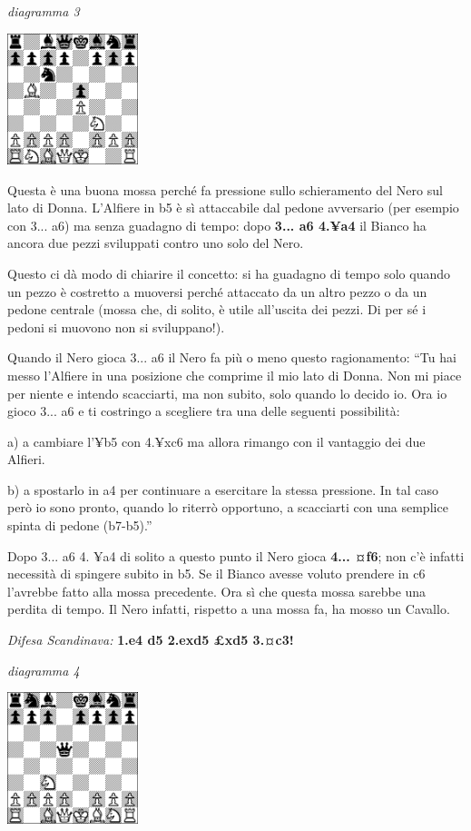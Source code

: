 \documentclass[
]{article}
\begin{document}
\emph{diagramma 3}

\includegraphics[width=1.50417in,height=1.50417in]{vertopal_109f12be458a423d8f3cc838880eaea2/media/image3.png}

Questa è una buona mossa perché fa pressione sullo schieramento del Nero
sul lato di Donna. L'Alfiere in b5 è sì attaccabile dal pedone
avversario (per esempio con 3... a6) ma senza guadagno di tempo: dopo
\textbf{3... a6 4.¥a4} il Bianco ha ancora due pezzi sviluppati contro
uno solo del Nero.

Questo ci dà modo di chiarire il concetto: si ha guadagno di tempo solo
quando un pezzo è costretto a muoversi perché attaccato da un altro
pezzo o da un pedone centrale (mossa che, di solito, è utile all'uscita
dei pezzi. Di per sé i pedoni si muovono non si sviluppano!).

Quando il Nero gioca 3... a6 il Nero fa più o meno questo ragionamento:
``Tu hai messo l'Alfiere in una posizione che comprime il mio lato di
Donna. Non mi piace per niente e intendo scacciarti, ma non subito, solo
quando lo decido io. Ora io gioco 3... a6 e ti costringo a scegliere tra
una delle seguenti possibilità:

a) a cambiare l'¥b5 con 4.¥xc6 ma allora rimango con il vantaggio dei
due Alfieri.

b) a spostarlo in a4 per continuare a esercitare la stessa pressione. In
tal caso però io sono pronto, quando lo riterrò opportuno, a scacciarti
con una semplice spinta di pedone (b7-b5).''

Dopo 3... a6 4. ¥a4 di solito a questo punto il Nero gioca \textbf{4...
¤f6}; non c'è infatti necessità di spingere subito in b5. Se il Bianco
avesse voluto prendere in c6 l'avrebbe fatto alla mossa precedente. Ora
sì che questa mossa sarebbe una perdita di tempo. Il Nero infatti,
rispetto a una mossa fa, ha mosso un Cavallo.

\emph{Difesa Scandinava:} \textbf{1.e4 d5 2.exd5 £xd5 3.¤c3!}

\emph{diagramma 4}

\includegraphics[width=1.50417in,height=1.50417in]{vertopal_109f12be458a423d8f3cc838880eaea2/media/image4.png}
\end{document}
